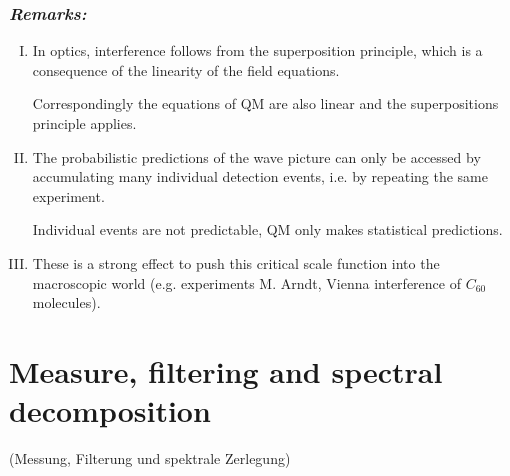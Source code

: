\subsubsection*{\emph{Remarks:}}

\begin{enumerate}[I)]
	\item In optics, interference follows from the superposition principle, which is a consequence of the linearity of the field equations.\par
	Correspondingly the equations of QM are also linear and the superpositions principle applies.
	\item The probabilistic predictions of the wave picture can only be accessed by accumulating many individual detection events, i.e. by repeating the same experiment.\par
	Individual events are not predictable, QM only makes statistical predictions.
	\item These is a strong effect to push this critical scale function into the macroscopic world (e.g. experiments M. Arndt, Vienna interference of $ C_{60} $ molecules).
\end{enumerate}

\section{Measure, filtering and spectral decomposition}

(Messung, Filterung und spektrale Zerlegung)

